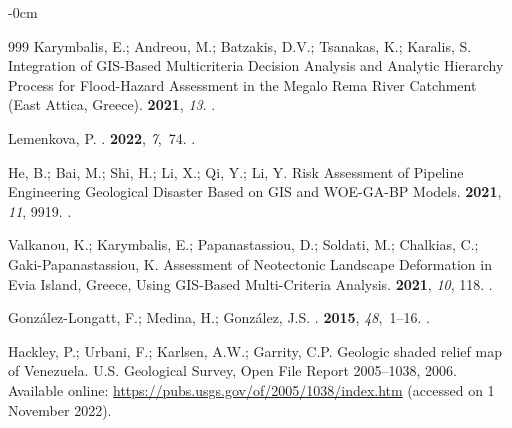 \documentclass[sustainability,article,accept,pdftex,moreauthors]{Definitions/mdpi}
\begin{document}
\begin{adjustwidth}{-\extralength}{0cm}
\begin{thebibliography}{999}
Karymbalis, E.; Andreou, M.; Batzakis, D.V.; Tsanakas, K.; Karalis, S.
\newblock Integration of GIS-Based Multicriteria Decision Analysis and Analytic
  Hierarchy Process for Flood-Hazard Assessment in the Megalo Rema River
  Catchment (East Attica, Greece).
 {\bf 2021}, {\em 13}.
.

Lemenkova, P.
.
 {\bf 2022}, {\em 7},~74.
.

He, B.; Bai, M.; Shi, H.; Li, X.; Qi, Y.; Li, Y.
\newblock Risk Assessment of Pipeline Engineering Geological Disaster Based on
  GIS and WOE-GA-BP Models.
 {\bf 2021}, {\em 11}, 9919.
.

Valkanou, K.; Karymbalis, E.; Papanastassiou, D.; Soldati, M.; Chalkias, C.;
  Gaki-Papanastassiou, K.
\newblock Assessment of Neotectonic Landscape Deformation in Evia Island,
  Greece, Using GIS-Based Multi-Criteria Analysis.
 {\bf 2021}, {\em
  10}, 118.
.

González-Longatt, F.; Medina, H.; González, J.S.
.
 {\bf 2015}, {\em
  48},~1--16.
.

Hackley, P.; Urbani, F.; Karlsen, A.W.; Garrity, C.P.
\newblock Geologic shaded relief map of Venezuela.
\newblock U.S. Geological Survey, Open File Report 2005–1038,  2006.
\newblock  Available online: \url{https://pubs.usgs.gov/of/2005/1038/index.htm} (accessed on 1 November 2022). %



\end{thebibliography}
\end{adjustwidth}
\end{document}
